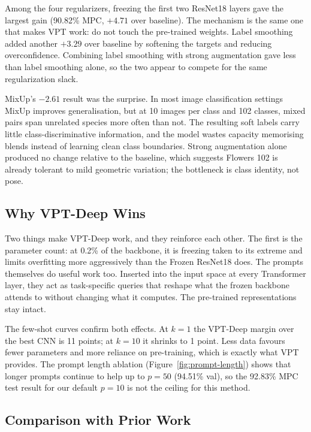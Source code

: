 Among the four regularizers, freezing the first two ResNet18 layers gave the largest gain (90.82\% MPC, $+4.71$ over baseline). The mechanism is the same one that makes VPT work: do not touch the pre-trained weights. Label smoothing added another $+3.29$ over baseline by softening the targets and reducing overconfidence. Combining label smoothing with strong augmentation gave less than label smoothing alone, so the two appear to compete for the same regularization slack.

MixUp's $-2.61$ result was the surprise. In most image classification settings MixUp improves generalisation, but at 10 images per class and 102 classes, mixed pairs span unrelated species more often than not. The resulting soft labels carry little class-discriminative information, and the model wastes capacity memorising blends instead of learning clean class boundaries. Strong augmentation alone produced no change relative to the baseline, which suggests Flowers 102 is already tolerant to mild geometric variation; the bottleneck is class identity, not pose.

\subsection{Why VPT-Deep Wins}

Two things make VPT-Deep work, and they reinforce each other. The first is the parameter count: at 0.2\% of the backbone, it is freezing taken to its extreme and limits overfitting more aggressively than the Frozen ResNet18 does. The prompts themselves do useful work too. Inserted into the input space at every Transformer layer, they act as task-specific queries that reshape what the frozen backbone attends to without changing what it computes. The pre-trained representations stay intact.

The few-shot curves confirm both effects. At $k = 1$ the VPT-Deep margin over the best CNN is 11 points; at $k = 10$ it shrinks to 1 point. Less data favours fewer parameters and more reliance on pre-training, which is exactly what VPT provides. The prompt length ablation (Figure~\ref{fig:prompt-length}) shows that longer prompts continue to help up to $p = 50$ (94.51\% val), so the 92.83\% MPC test result for our default $p = 10$ is not the ceiling for this method.

\subsection{Comparison with Prior Work}

